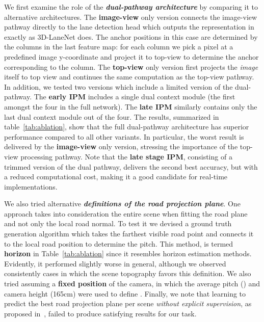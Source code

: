 \documentclass[10pt,twocolumn,letterpaper]{article}
\begin{document}
We first examine the role of the \textit{\textbf{dual-pathway architecture}} by comparing it to alternative architectures. The \textbf{image-view} only version connects the image-view pathway directly to the lane detection head which outputs the representation in  exactly as 3D-LaneNet does. The anchor positions  in this case are determined by the columns in the last feature map: for each column we pick a pixel at a predefined image y-coordinate and project it to top-view to determine the anchor corresponding to the column. The \textbf{top-view} only version first projects the \textit{image} itself to top view and continues the same computation as the top-view pathway. In addition, we tested two versions which include a limited version of the dual-pathway. The \textbf{early IPM} includes a single dual context module (the first amongst the four in the full network). The \textbf{late IPM} similarly contains only the last dual context module out of the four. The results,  summarized in table~\ref{tab:ablation}, show that the full dual-pathway architecture has superior performance compared to all other variants. In particular, the worst result is delivered by the \textbf{image-view} only version, stressing the importance of the top-view processing pathway. Note that the \textbf{late stage IPM}, consisting of a trimmed version of the dual pathway, delivers the second best accuracy, but with a reduced computational cost, making it a good candidate for real-time implementations.


We also tried alternative \textit{\textbf{definitions of the road projection plane}}. One approach takes into consideration the entire scene when fitting the road plane and not only the local road normal. To test it we devised a ground truth generation algorithm which takes the farthest visible road point and connects it to the local road position to determine the pitch. This method, is termed \textbf{horizon} in Table~\ref{tab:ablation} since it resembles horizon estimation methods. Evidently, it performed slightly worse in general, although we observed consistently cases in which the scene topography favors this definition. We also tried assuming a \textbf{fixed position} of the camera, in which the average pitch () and camera height (165cm) were used to define . Finally, we note that learning to predict the best road projection plane per scene \textit{without explicit supervision}, as proposed in~\cite{neven}, failed to produce satisfying results for our task. 
\end{document}
